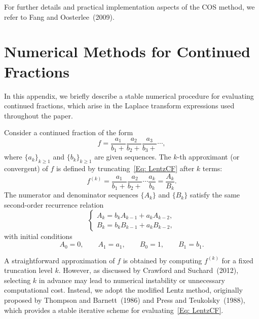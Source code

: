 \documentclass[11pt]{article}
\begin{document}
For further details and practical implementation aspects of the COS method, we refer to Fang and Oosterlee~(2009).


\section{Numerical Methods for Continued Fractions}\label{numerical2appendix}

In this appendix, we briefly describe a stable numerical procedure for evaluating continued fractions, which arise in the Laplace transform expressions used throughout the paper.

Consider a continued fraction of the form
\begin{equation}\label{Eq: LentzCF}
    f
    =
    \frac{a_1}{b_1+}
    \frac{a_2}{b_2+}
    \frac{a_3}{b_3+}\cdots,
\end{equation}
where $\{a_k\}_{k\geq 1}$ and $\{b_k\}_{k\geq 1}$ are given sequences. 
The $k$-th approximant (or convergent) of $f$ is defined by truncating~\eqref{Eq: LentzCF} after $k$ terms:
\begin{equation}
    f^{(k)}
    =
    \frac{a_1}{b_1+}
    \frac{a_2}{b_2+}
    \cdots
    \frac{a_k}{b_k}
    =
    \frac{A_k}{B_k}.
\end{equation}
The numerator and denominator sequences $\{A_k\}$ and $\{B_k\}$ satisfy the same second-order recurrence relation
\begin{equation}\label{recurrence}
    \begin{cases}
        A_k = b_k A_{k-1} + a_k A_{k-2},\\[0.3em]
        B_k = b_k B_{k-1} + a_k B_{k-2},
    \end{cases}
\end{equation}
with initial conditions
\[
A_0=0,\qquad A_1=a_1,\qquad B_0=1,\qquad B_1=b_1.
\]

A straightforward approximation of $f$ is obtained by computing $f^{(k)}$ for a fixed truncation level $k$. 
However, as discussed by Crawford and Suchard~(2012), selecting $k$ in advance may lead to numerical instability or unnecessary computational cost. 
Instead, we adopt the modified Lentz method, originally proposed by Thompson and Barnett~(1986) and Press and Teukolsky~(1988), which provides a stable iterative scheme for evaluating~\eqref{Eq: LentzCF}.

\medskip
\end{document}
